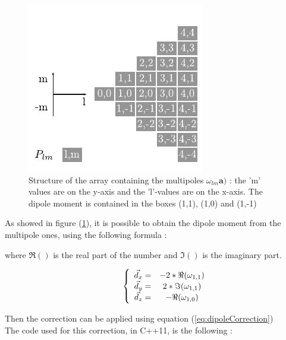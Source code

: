 \documentclass[11pt,twoside,a4paper]{report}
\begin{document}
	\begin{figure}[H]
	\label{fig:triArray} 
	\includegraphics[scale=1]{triArray}
    \centering 
    \caption{Structure of the array containing the multipoles $\omega_{lm}\textbf{a})$ : the 'm' values are on the y-axis and the 'l'-values are on the x-axis. The dipole moment is contained in the boxes (1,1), (1,0) and (1,-1) }
   \label{fig:triArray}     
   \end{figure} 

As showed in figure (\ref{fig:triArray}), it is possible to obtain the dipole moment from the multipole ones, using the following formula :



where $\Re()$ is the real part of the number and $\Im()$ is the imaginary part.

\begin{equation}
\hspace{10 mm}
\left\lbrace
\begin{array}{ccc}
\vec{d}_x = & -2 * \Re(\omega_{1,1})\\
\vec{d}_y = &  2 * \Im(\omega_{1,1})\\
\vec{d}_z = & -\Re(\omega_{1,0})
\end{array}\right.
\end{equation}

Then the correction can be applied using equation (\ref{eq:dipoleCorrection})\\


The code used for this correction, in C++11, is the following :
	
\end{document}

